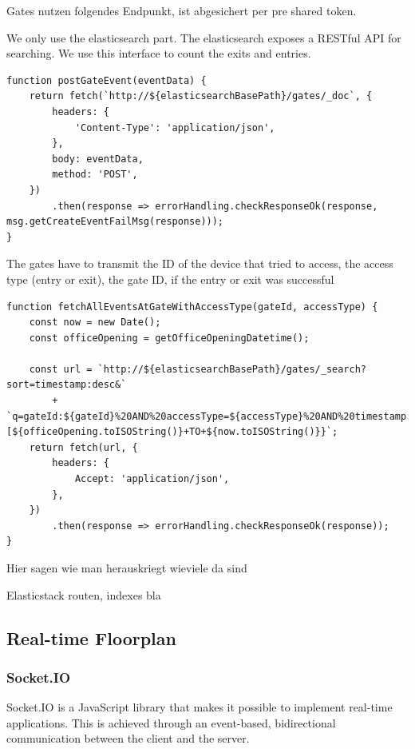 Gates nutzen folgendes Endpunkt, ist abgesichert per pre shared token.



We only use the elasticsearch part. The elasticsearch exposes a RESTful API for searching.
We use this interface to count the exits and entries.
\begin{lstlisting}[label=searchElasticPOST]
function postGateEvent(eventData) {
    return fetch(`http://${elasticsearchBasePath}/gates/_doc`, {
        headers: {
            'Content-Type': 'application/json',
        },
        body: eventData,
        method: 'POST',
    })
        .then(response => errorHandling.checkResponseOk(response, msg.getCreateEventFailMsg(response)));
}
\end{lstlisting}

The gates have to transmit the ID of the device that tried to access, the access type (entry or exit), the gate ID, if the entry or exit was successful

\begin{lstlisting}[label=searchElasticGET]
function fetchAllEventsAtGateWithAccessType(gateId, accessType) {
    const now = new Date();
    const officeOpening = getOfficeOpeningDatetime();

    const url = `http://${elasticsearchBasePath}/gates/_search?sort=timestamp:desc&`
        + `q=gateId:${gateId}%20AND%20accessType=${accessType}%20AND%20timestamp:[${officeOpening.toISOString()}+TO+${now.toISOString()}}`;
    return fetch(url, {
        headers: {
            Accept: 'application/json',
        },
    })
        .then(response => errorHandling.checkResponseOk(response));
}
\end{lstlisting}


Hier sagen wie man herauskriegt wieviele da sind


Elasticstack routen, indexes bla


\subsection{Real-time Floorplan}
\label{Real-time Floorplan}

\subsubsection{Socket.IO}
\label{Socket.IO}

Socket.IO is a JavaScript library that makes it possible to implement real-time applications. This is achieved through an event-based, bidirectional communication between the client and the server. 

